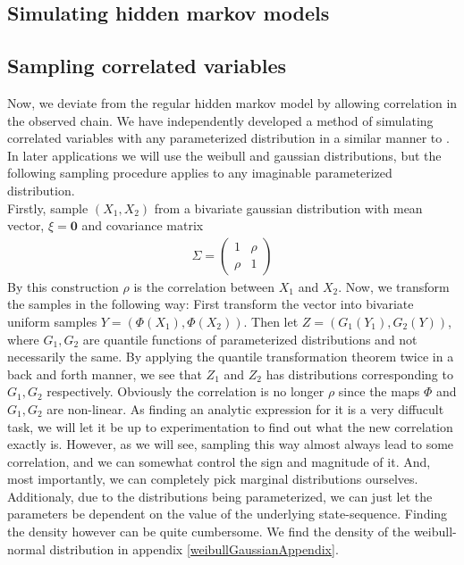 \subsection{Simulating hidden markov models}

\subsection{Sampling correlated variables}\label{correlatedVariables}
Now, we deviate from the regular hidden markov model by allowing correlation in the observed chain. We have independently developed a method of simulating correlated variables with any parameterized distribution in a similar manner to \cite{thomasWard}. In later applications we will use the weibull and gaussian distributions, but the following sampling procedure applies to any imaginable parameterized distribution.\\ Firstly, sample $(X_1, X_2)$ from a bivariate gaussian distribution with mean vector, $\xi = \mathbf{0}$ and covariance matrix 
\begin{align}\Sigma = \begin{pmatrix}
    1 & \rho \\
    \rho & 1
\end{pmatrix}
\end{align}
By this construction $\rho$ is the correlation between $X_1$ and $X_2$. Now, we transform the samples in the following way: First transform the vector into bivariate uniform samples $Y = (\Phi(X_1),\Phi(X_2))$. Then let $Z = (G_1(Y_1), G_2(Y))$, where $G_1, G_2$ are quantile functions of parameterized distributions and not necessarily the same. By applying the quantile transformation theorem twice in a back and forth manner, we see that $Z_1$ and $Z_2$ has distributions corresponding to $G_1, G_2$ respectively. Obviously the correlation is no longer $\rho$ since the maps $\Phi$ and $G_1, G_2$ are non-linear. As finding an analytic expression for it is a very diffucult task, we will let it be up to experimentation to find out what the new correlation exactly is. However, as we will see, sampling this way almost always lead to some correlation, and we can somewhat control the sign and magnitude of it. And, most importantly, we can completely pick marginal distributions ourselves. Additionaly, due to the distributions being parameterized, we can just let the parameters be dependent on the value of the underlying state-sequence. Finding the density however can be quite cumbersome. We find the density of the weibull-normal distribution in appendix \ref{weibullGaussianAppendix}.